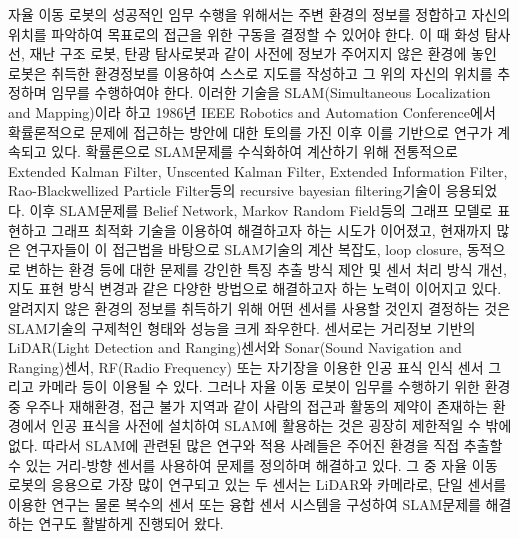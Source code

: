 \documentclass[master,korean,final]{cbnu-ecs}
\begin{document}
자율 이동 로봇의 성공적인 임무 수행을 위해서는 주변 환경의 정보를 정합하고 자신의 위치를 파악하여 목표로의 접근을 위한 구동을 결정할 수 있어야 한다. 이 때 화성 탐사선, 재난 구조 로봇, 탄광 탐사로봇과 같이 사전에 정보가 주어지지 않은 환경에 놓인 로봇은 취득한 환경정보를 이용하여 스스로 지도를 작성하고 그 위의 자신의 위치를 추정하며 임무를 수행하여야 한다. 이러한 기술을 SLAM(Simultaneous Localization and Mapping)이라 하고 1986년 IEEE Robotics and Automation Conference에서 확률론적으로 문제에 접근하는 방안에 대한 토의를 가진 이후 이를 기반으로 연구가 계속되고 있다\cite{Durrant2006}. 확률론으로 SLAM문제를 수식화하여 계산하기 위해 전통적으로 Extended Kalman Filter\cite{Dissanayake2000}, Unscented Kalman Filter\cite{Martinez2005}, Extended Information Filter\cite{Thrun2003}, Rao-Blackwellized Particle Filter\cite{Montemerlo2002}등의 recursive bayesian filtering기술이 응용되었다. 이후 SLAM문제를 Belief Network, Markov Random Field등의 그래프 모델로 표현하고 그래프 최적화 기술을 이용하여 해결하고자 하는 시도가 이어졌고\cite{Kummerle2011}, 
현재까지 많은 연구자들이 이 접근법을 바탕으로 SLAM기술의 계산 복잡도, loop closure, 동적으로 변하는 환경 등에 대한 문제를 강인한 특징 추출 방식 제안 및 센서 처리 방식 개선, 지도 표현 방식 변경과 같은 다양한 방법으로 해결하고자 하는 노력이 이어지고 있다.\\
알려지지 않은 환경의 정보를 취득하기 위해 어떤 센서를 사용할 것인지 결정하는 것은 SLAM기술의 구제척인 형태와 성능을 크게 좌우한다. 센서로는 거리정보 기반의 LiDAR(Light Detection and Ranging)센서와 Sonar(Sound Navigation and Ranging)센서, RF(Radio Frequency) 또는 자기장을 이용한 인공 표식 인식 센서 그리고 카메라 등이 이용될 수 있다. 그러나 자율 이동 로봇이 임무를 수행하기 위한 환경 중 우주나 재해환경, 접근 불가 지역과 같이 사람의 접근과 활동의 제약이 존재하는 환경에서 인공 표식을 사전에 설치하여 SLAM에 활용하는 것은 굉장히 제한적일 수 밖에 없다. 따라서 SLAM에 관련된 많은 연구와 적용 사례들은 주어진 환경을 직접 추출할 수 있는 거리-방향 센서를 사용하여 문제를 정의하며 해결하고 있다. 그 중 자율 이동 로봇의 응용으로 가장 많이 연구되고 있는 두 센서는 LiDAR와 카메라로, 단일 센서를 이용한 연구는 물론 복수의 센서 또는 융합 센서 시스템을 구성하여 SLAM문제를 해결하는 연구도 활발하게 진행되어 왔다.\\
\end{document}
